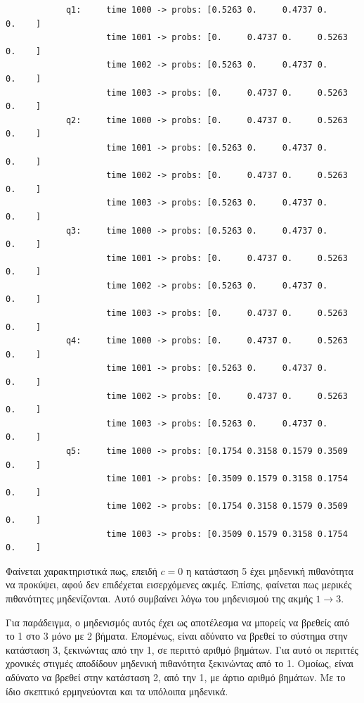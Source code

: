 \documentclass{article}
\begin{document}
    \begin{verbatim}
            q1:     time 1000 -> probs: [0.5263 0.     0.4737 0.     0.    ]
                    time 1001 -> probs: [0.     0.4737 0.     0.5263 0.    ]
                    time 1002 -> probs: [0.5263 0.     0.4737 0.     0.    ]
                    time 1003 -> probs: [0.     0.4737 0.     0.5263 0.    ]
            q2:     time 1000 -> probs: [0.     0.4737 0.     0.5263 0.    ]
                    time 1001 -> probs: [0.5263 0.     0.4737 0.     0.    ]
                    time 1002 -> probs: [0.     0.4737 0.     0.5263 0.    ]
                    time 1003 -> probs: [0.5263 0.     0.4737 0.     0.    ]
            q3:     time 1000 -> probs: [0.5263 0.     0.4737 0.     0.    ]
                    time 1001 -> probs: [0.     0.4737 0.     0.5263 0.    ]
                    time 1002 -> probs: [0.5263 0.     0.4737 0.     0.    ]
                    time 1003 -> probs: [0.     0.4737 0.     0.5263 0.    ]
            q4:     time 1000 -> probs: [0.     0.4737 0.     0.5263 0.    ]
                    time 1001 -> probs: [0.5263 0.     0.4737 0.     0.    ]
                    time 1002 -> probs: [0.     0.4737 0.     0.5263 0.    ]
                    time 1003 -> probs: [0.5263 0.     0.4737 0.     0.    ]
            q5:     time 1000 -> probs: [0.1754 0.3158 0.1579 0.3509 0.    ]
                    time 1001 -> probs: [0.3509 0.1579 0.3158 0.1754 0.    ]
                    time 1002 -> probs: [0.1754 0.3158 0.1579 0.3509 0.    ]
                    time 1003 -> probs: [0.3509 0.1579 0.3158 0.1754 0.    ]
    \end{verbatim}

Φαίνεται χαρακτηριστικά πως, επειδή $c = 0$ η κατάσταση 5 έχει μηδενική
πιθανότητα να προκύψει, αφού δεν επιδέχεται εισερχόμενες ακμές. Επίσης,
φαίνεται πως μερικές πιθανότητες μηδενίζονται. Αυτό συμβαίνει λόγω του
μηδενισμού της ακμής $1 \rightarrow 3$. 

Για παράδειγμα, ο μηδενισμός αυτός έχει ως αποτέλεσμα να μπορείς να βρεθείς από
το 1 στο 3 μόνο με 2 βήματα. Επομένως, είναι αδύνατο να βρεθεί το σύστημα στην
κατάσταση 3, ξεκινώντας από την 1, σε περιττό αριθμό βημάτων. Για αυτό οι
περιττές χρονικές στιγμές αποδίδουν μηδενική πιθανότητα ξεκινώντας από το 1.
Ομοίως, είναι αδύνατο να βρεθεί στην κατάσταση 2, από την 1, με άρτιο αριθμό
βημάτων. Με το ίδιο σκεπτικό ερμηνεύονται και τα υπόλοιπα μηδενικά.
\end{document}
